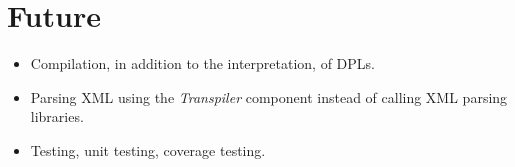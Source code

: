 \documentclass[10pt,anonymous,review]{acmart}
\begin{document}
\section{Future}
\begin{itemize}
\setlength\itemsep{-0.3em}
\item Compilation, in addition to the interpretation, of DPLs.

\item Parsing XML using the \emph{Transpiler} component instead of calling XML parsing libraries.

\item Testing, unit testing, coverage testing.

\end{itemize}
\end{document}
